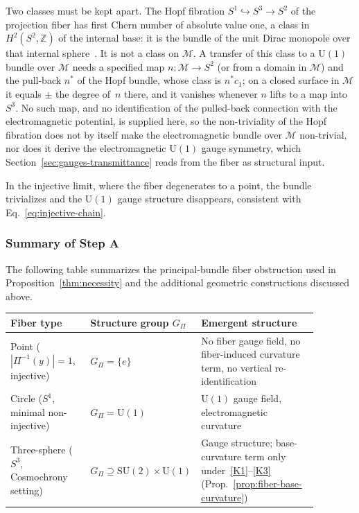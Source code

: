     Two classes must be kept apart.
    The Hopf fibration $S^1 \hookrightarrow S^3 \to S^2$ of the projection fiber has first Chern number of
    absolute value one, a class in $H^2(S^2, \mathbb{Z})$ of the internal base: it is the bundle of the unit Dirac
    monopole over that internal sphere~\cite{Trautman1977}.
    It is not a class on $\mathcal{M}$.
    A transfer of this class to a $\mathrm{U}(1)$ bundle over $\mathcal{M}$ needs a specified map
    $n : \mathcal{M} \to S^2$ (or from a domain in $\mathcal{M}$) and the pull-back $n^*$ of the Hopf bundle,
    whose class is $n^* c_1$; on a closed surface in $\mathcal{M}$ it equals $\pm$ the degree of~$n$ there, and it
    vanishes whenever $n$ lifts to a map into $S^3$.
    No such map, and no identification of the pulled-back connection with the electromagnetic potential, is
    supplied here, so the non-triviality of the Hopf fibration does not by itself make the electromagnetic bundle
    over $\mathcal{M}$ non-trivial, nor does it derive the electromagnetic $\mathrm{U}(1)$ gauge symmetry, which
    Section~\ref{sec:gauges-transmittance} reads from the fiber as structural input.

    In the injective limit, where the fiber degenerates to a point, the bundle trivializes and the $\mathrm{U}(1)$ gauge
    structure disappears, consistent with Eq.~\eqref{eq:injective-chain}.

  \subsubsection*{Summary of Step A}
    \label{subsec:stepA-summary}

    The following table summarizes the principal-bundle fiber obstruction used in
    Proposition~\ref{thm:necessity} and the additional geometric constructions discussed above.

    \begin{center}
      \begin{tabular}{p{0.26\linewidth}p{0.24\linewidth}p{0.38\linewidth}}
        \hline
        \raggedright Fiber type & \raggedright Structure group $G_\Pi$ & \raggedright Emergent structure
        \tabularnewline
        \hline
        \raggedright Point ($|\Pi^{-1}(y)| = 1$, injective)
        & \raggedright $G_\Pi = \{e\}$
        & \raggedright No fiber gauge field, no fiber-induced curvature term, no vertical re-identification
        \tabularnewline
        \raggedright Circle ($S^1$, minimal non-injective)
        & \raggedright $G_\Pi = \mathrm{U}(1)$
        & \raggedright $\mathrm{U}(1)$ gauge field, electromagnetic curvature
        \tabularnewline
        \raggedright Three-sphere ($S^3$, Cosmochrony setting)
        & \raggedright $G_\Pi \supseteq \mathrm{SU}(2) \times \mathrm{U}(1)$
        & \raggedright Gauge structure; base-curvature term only under~\ref{K1}--\ref{K3}
        (Prop.~\ref{prop:fiber-base-curvature})
        \tabularnewline
        \hline
      \end{tabular}
    \end{center}

